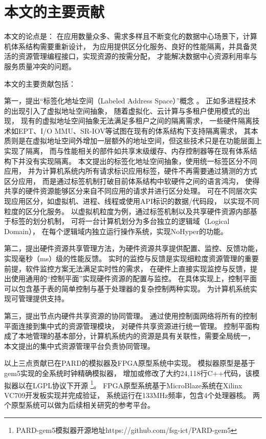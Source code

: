 \section{本文的主要贡献}

本文的论点是：
在应用数量众多、需求多样且不断变化的数据中心场景下，计算机体系结构需要重新设计，
为应用提供区分化服务、良好的性能隔离，并具备灵活的资源管理编程接口，实现资源的按需分配，
才能解决数据中心资源利用率与服务质量冲突的问题。

本文的主要贡献包括：

第一，提出``标签化地址空间（Labeled Address Space）''概念 。
正如多进程技术的出现引入了虚拟地址空间抽象，
随着虚拟化、云计算与多租户使用模式的出现，
现有的虚拟地址空间抽象无法满足多租户之间的隔离需求，
一些硬件隔离技术如EPT、I/O MMU、SR-IOV等试图在现有的体系结构下支持隔离需求，
其本质则是在虚拟地址空间外增加一层额外的地址空间，但这些技术只是在功能层面上实现了隔离，
而与性能相关的部件如共享末级缓存、内存控制器等在现有体系结构下并没有实现隔离。
本文提出的标签化地址空间抽象，使用统一标签区分不同应用，
并为计算机系统内所有请求标识应用标签，硬件不再需要通过猜测的方式区分应用，
而是通过标签机制打破目前体系结构中软硬件之间的语言鸿沟，
使得共享的硬件资源能够区分来自不同应用的请求并进行区分处理。
可在不同层次实现应用区分，如虚拟机、进程、线程或使用API标识的数据/代码段，
以实现不同粒度的区分化服务。
以虚拟机粒度为例，通过标签机制以及共享硬件资源内部基于标签的划分机制，
可将一台计算机划分为多台独立的逻辑域（Logical Domain），
在每个逻辑域内独立运行操作系统，实现NoHyper\cite{keller_nohype:_2010}的功能。

第二，提出硬件资源共享管理方法，为硬件资源共享提供配置、监控、反馈功能，
实现毫秒（ms）级的性能反馈。
实时的监控与反馈是实现细粒度资源管理的重要前提，软件监控方案无法满足实时性的需求，
在硬件上直接实现监控与反馈，提出使用通用的``控制平面''实现硬件资源的配置与监控。
在具体实现上，控制平面可以包含基于表的简单控制与基于处理器的复杂控制两种实现。
为计算机系统实现可管理提供支持。

第三，提出节点内硬件共享资源的协同管理。
通过使用控制面网络将所有的控制平面连接到集中式的资源管理模块，
对硬件共享资源进行统一管理。
控制平面构成了本地管理的基本部分，计算机系统内的资源是具有关联性，需要全局统一，
本文提出的集中式资源管理平台负责协同管理。

以上三点贡献已在PARD的模拟器及FPGA原型系统中实现。
模拟器原型是基于gem5\cite{binkert_gem5_2011}实现的全系统时钟精确模拟器，
增加或修改了大约24,118行C++代码，该模拟器以在LGPL协议下开源
\footnote{PARD-gem5模拟器开源地址https://github.com/fsg-ict/PARD-gem5}。
FPGA原型系统基于MicroBlaze系统在Xilinx VC709开发板实现并完成验证，
系统运行在133MHz频率，包含4个处理器核。
两个原型系统可以做为后续相关研究的参考平台。


